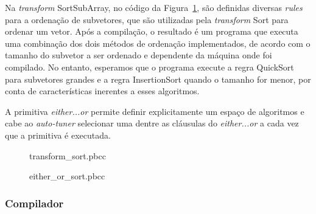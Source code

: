 \documentclass[a4paper, 12pt]{article}
\begin{document}
Na \emph{transform} SortSubArray, no código da Figura~\ref{fig:sortpbcc}, são
definidas diversas \emph{rules} para a ordenação de subvetores, que
são utilizadas pela \emph{transform} Sort para ordenar um vetor. Após a
compilação, o resultado é um programa que executa uma combinação dos dois
métodos de ordenação implementados, de acordo com o tamanho do subvetor a
ser ordenado e dependente da máquina onde foi compilado. No entanto, esperamos
que o programa execute a regra QuickSort para subvetores grandes e a
regra InsertionSort quando o tamanho for menor, por conta de características
inerentes a esses algoritmos.

A primitiva \emph{either...or} permite definir explicitamente um espaço
de algoritmos e cabe ao \emph{auto-tuner} selecionar uma dentre as cláusulas
do \emph{either...or} a cada vez que a primitiva é executada.

\begin{figure}[H]
    \centering
    
    \caption{transform\_sort.pbcc}
    \label{fig:sortpbcc}
\end{figure}

\begin{figure}[H]
    \centering
    
    \caption{either\_or\_sort.pbcc}
    \label{fig:sort2pbcc}
\end{figure}

\subsubsection{Compilador}
\end{document}
